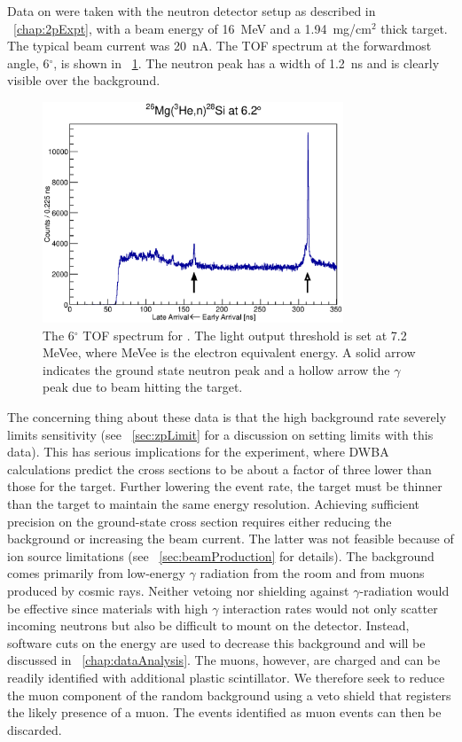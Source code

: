 Data on \MgReaction were taken with the neutron detector setup as described in {\chap}~\ref{chap:2pExpt}, with a beam energy of 16~MeV and a 1.94~mg/cm$^2$ thick  target.  The typical beam current was 20~nA. The TOF spectrum at the forwardmost angle, 6$^{\circ}$, is shown in {\fig}~\ref{fig:MgTOF}.  The neutron peak has a width of 1.2~ns and is clearly visible over the background. 
\begin{figure}[!htbp]
\centering
\includegraphics[width=0.8\textwidth]{figures/26Mg_veryOld.eps}
\caption[Timing spectrum for \MgReaction.]{The 6$^{\circ}$ TOF spectrum for \MgReaction.  The light output threshold is set at 7.2 MeVee, where MeVee is the electron equivalent energy.  A solid arrow indicates the ground state neutron peak and a hollow arrow the $\gamma$ peak due to beam hitting the target.}
\label{fig:MgTOF}
\end{figure}

The concerning thing about these data is that the high background rate severely limits sensitivity (see {\sect}~\ref{sec:zpLimit} for a discussion on setting limits with this data).  This has serious implications for the \GeTargets experiment, where DWBA calculations predict the cross sections to be about a factor of three lower than those for the  target.  Further lowering the event rate, the \GeTargets target must be thinner than the  target to maintain the same energy resolution.  Achieving sufficient precision on the ground-state cross section requires either reducing the background or increasing the beam current.  The latter was not feasible because of ion source limitations (see {\sect}~\ref{sec:beamProduction} for details).  The background comes primarily from low-energy $\gamma$ radiation from the room and from muons produced by cosmic rays.  Neither vetoing nor shielding against $\gamma$-radiation would be effective since materials with high $\gamma$ interaction rates would not only scatter incoming neutrons but also be difficult to mount on the detector.  Instead, software cuts on the energy are used to decrease this background and will be discussed in {\chap}~\ref{chap:dataAnalysis}.  The muons, however, are charged and can be readily identified with additional plastic scintillator.  We therefore seek to reduce the muon component of the random background using a veto shield that registers the likely presence of a muon.  The events identified as muon events can then be discarded.  

